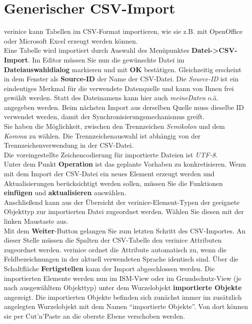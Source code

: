 \documentclass[a4paper,10pt]{book}
\begin{document}
\section{Generischer CSV-Import} \label{Generischer CSV-Import}
verinice kann Tabellen im CSV-Format importieren, wie sie z.B. mit OpenOffice oder Microsoft Excel erzeugt werden können.
\newline\\
Eine Tabelle wird importiert durch Auswahl des Menüpunktes \textbf{Datei-\textgreater CSV-Import}. Im Editor müssen Sie nun die gewünschte Datei im
\textbf{Dateiauswahldialog} markieren und mit \textbf{ OK} bestätigen.
Gleichzeitig erscheint in dem Fenster als \textbf{Source-ID} der Name der CSV-Datei. Die \textit{Source-ID} ist ein eindeutiges Merkmal für die verwendete
Datenquelle und kann von Ihnen frei gewählt werden. Statt des Dateinamens kann hier auch \textit{meineDaten} o.ä. angegeben werden.
Beim nächsten Import aus derselben Quelle muss dieselbe ID verwendet werden, damit der Synchronisierungsmechanismus greift.
\newline\\
Sie haben die Möglichkeit, zwischen den Trennzeichen \textit{Semikolon} und dem \textit{Komma} zu wählen. Die Trennzeichenauswahl ist
abhängig von der Trennzeichenverwendung in der CSV-Datei.
\newline\\
Die voreingestellte Zeichencodierung für importierte Dateien ist \textit{UTF-8}.
\newline\\
Unter dem Punkt \textbf{Operation} ist das geplante Vorhaben zu konkretisieren. Wenn mit dem Import der CSV-Datei ein neues Element erzeugt
werden und Aktualisierungen berücksichtigt werden sollen, müssen Sie die Funktionen \textbf{einfügen} und \textbf{aktualisieren} auswählen.
\newline\\
Anschließend kann aus der Übersicht der verinice-Element-Typen der geeignete Objekttyp zur importierten Datei zugeordnet werden. Wählen
Sie diesen mit der linken Maustaste aus.
\newline\\
Mit dem \textbf{Weiter}-Button gelangen Sie zum letzten Schritt des CSV-Importes. An dieser Stelle müssen die Spalten der CSV-Tabelle den verinice
Attributen zugeordnet werden. verinice ordnet die Attribute automatisch zu, wenn die Feldbezeichnungen in der aktuell verwendeten Sprache identisch
sind. Über die Schaltfläche \textbf{Fertigstellen} kann der Import abgeschlossen werden.
Die importierten Elemente werden nun im ISM-View oder im Grundschutz-View (je nach ausgewähltem Objekttyp) unter dem Wurzelobjekt
\textbf{importierte Objekte} angezeigt.
Die importierten Objekte befinden sich zunächst immer im zusätzlich angelegten Wurzelobjekt mit dem Namen ``importierte Objekte''.
Von dort können sie per Cut'n'Paste an die oberste Ebene verschoben werden.
\end{document}
